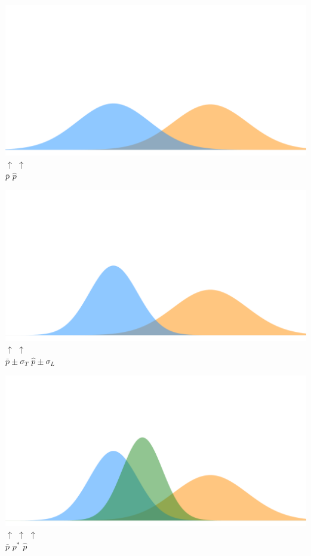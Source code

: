 \documentclass[handout]{beamer}
\begin{document}
  \begin{frame}
    \includegraphics[width = \textwidth]{images/illustration_3.pdf}
    \tabto{38mm}$\uparrow$  \tabto{73mm}$\uparrow$\\
    \tabto{38mm}$\bar p$    \tabto{73mm}$\hat p$
  \end{frame}

  \begin{frame}
    \includegraphics[width = \textwidth]{images/illustration_4.pdf}
    \tabto{38mm}$\uparrow$            \tabto{73mm}$\uparrow$\\
    \tabto{38mm}$\bar p \pm \sigma_T$ \tabto{73mm}$\hat p \pm \sigma_L$
  \end{frame}

  \begin{frame}
    \includegraphics[width = \textwidth]{images/illustration_5.pdf}
    \tabto{38mm}$\uparrow$  \tabto{48mm}$\uparrow$  \tabto{73mm}$\uparrow$\\
    \tabto{38mm}$\bar p$    \tabto{48mm}$p^*$       \tabto{73mm}$\hat p$
  \end{frame}
\end{document}
